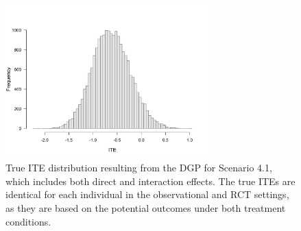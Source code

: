 % 




\begin{figure}[htbp]
\centering
\includegraphics[width=0.7\textwidth]{img/results/observ_scenario1_ite_distribution_dgp.png}
\caption{True ITE distribution resulting from the DGP for Scenario 4.1, which includes both direct and interaction effects. The true ITEs are identical for each individual in the observational and RCT settings, as they are based on the potential outcomes under both treatment conditions.}
\label{fig:scenario1_ite_distribution_dgp}
\end{figure}



